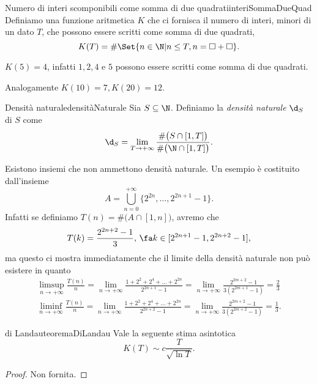 \begin{defn}{Numero di interi scomponibili come somma di due quadrati}{interiSommaDueQuad}
	Definiamo una funzione aritmetica \(K\) che ci fornisca il numero di interi, minori di un dato \(T\), che possono essere scritti come somma di due quadrati,
	\[
		K(T) = \#\Set{n\in \N | n\le T, n=\square+\square}.
	\]
\end{defn}

\begin{ese}
	\(K(5)=4\), infatti \(1,2,4\) e \(5\) possono essere scritti come somma di due quadrati.

	Analogamente \(K(10)=7,K(20)=12\).
\end{ese}

\begin{defn}{Densità naturale}{densitàNaturale}
	Sia \(S\subseteq \N\).
	Definiamo la \emph{densità naturale} \(\d_S\) di \(S\) come
	\[
		\d_S = \lim_{T \to +\infty} \frac{\#\big(S \cap [1,T]\big)}{\#\big(\N \cap [1,T]\big)}.
	\]
\end{defn}

\begin{oss}
	Esistono insiemi che non ammettono densità naturale.
	Un esempio è costituito dall'insieme
	\[
		A = \bigcup_{n=0}^{+\infty} \{2^{2n},\ldots,2^{2n+1}-1\}.
	\]
	Infatti se definiamo \(T(n) = \#\big(A \cap [1,n]\big)\), avremo che
	\[
		T(k) = \frac{2^{2n+2}-1}{3},\,\fa k \in [2^{2n+1}-1,2^{2n+2}-1],
	\]
	ma questo ci mostra immediatamente che il limite della densità naturale non può esistere in quanto
	\begin{gather*}
		\limsup_{n \to +\infty} \frac{T(n)}{n} = \lim_{n\to +\infty} \frac{1+2^2+2^4+\ldots+2^{2n}}{2^{2n+1}-1} = \lim_{n\to +\infty} \frac{2^{2m+2}-1}{3(2^{2m+1}-1)} = \frac{2}{3}\\
		\liminf_{n \to +\infty} \frac{T(n)}{n} = \lim_{n\to +\infty} \frac{1+2^2+2^4+\ldots+2^{2n}}{2^{2n+2}-1} = \lim_{n\to +\infty} \frac{2^{2m+2}-1}{3(2^{2m+2}-1)} = \frac{1}{3}.
	\end{gather*}
\end{oss}

\begin{teor}{di Landau}{teoremaDiLandau}
	Vale la seguente stima asintotica
	\[
		K(T) \sim c \frac{T}{\sqrt{\ln T}}.
	\]
\end{teor}

\begin{proof}
	Non fornita.
\end{proof}

